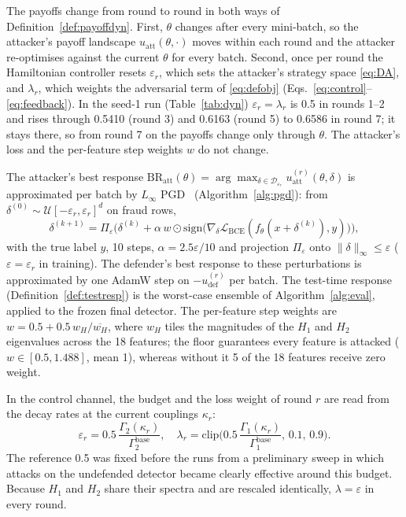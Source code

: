 \documentclass[conference]{IEEEtran}
\newcommand{\cL}{\mathcal{L}}
\newcommand{\BR}{\mathrm{BR}}
\newcommand{\sig}{\mathrm{sign}}
\begin{document}
The payoffs change from round to round in both ways of Definition~\ref{def:payoffdyn}. First, $\theta$ changes after every mini-batch, so the attacker's payoff landscape $u_{\mathrm{att}}(\theta,\cdot)$ moves within each round and the attacker re-optimises against the current $\theta$ for every batch. Second, once per round the Hamiltonian controller resets $\varepsilon_r$, which sets the attacker's strategy space \eqref{eq:DA}, and $\lambda_r$, which weights the adversarial term of \eqref{eq:defobj} (Eqs.~\eqref{eq:control}--\eqref{eq:feedback}). In the seed-1 run (Table~\ref{tab:dyn}) $\varepsilon_r=\lambda_r$ is 0.5 in rounds 1--2 and rises through 0.5410 (round 3) and 0.6163 (round 5) to 0.6586 in round 7; it stays there, so from round 7 on the payoffs change only through $\theta$. The attacker's loss and the per-feature step weights $w$ do not change.

The attacker's best response $\BR_{\mathrm{att}}(\theta)=\arg\max_{\delta\in\mathcal D_{\varepsilon_r}}u^{(r)}_{\mathrm{att}}(\theta,\delta)$ is approximated per batch by $L_\infty$ PGD~\cite{madry2018} (Algorithm~\ref{alg:pgd}): from $\delta^{(0)}\sim\mathcal U[-\varepsilon_r,\varepsilon_r]^d$ on fraud rows,
\begin{equation}
\delta^{(k+1)}=\Pi_\varepsilon\Big(\delta^{(k)}+\alpha\,w\odot\sig\big(\nabla_\delta\cL_{\mathrm{BCE}}(f_\theta(x+\delta^{(k)}),y)\big)\Big),
\label{eq:pgd}
\end{equation}
with the true label $y$, 10 steps, $\alpha=2.5\varepsilon/10$ and projection $\Pi_\varepsilon$ onto $\|\delta\|_\infty\le\varepsilon$ ($\varepsilon=\varepsilon_r$ in training). The defender's best response to these perturbations is approximated by one AdamW step on $-u^{(r)}_{\mathrm{def}}$ per batch. The test-time response (Definition~\ref{def:testresp}) is the worst-case ensemble of Algorithm~\ref{alg:eval}, applied to the frozen final detector. The per-feature step weights are $w=0.5+0.5\,w_H/\overline{w_H}$, where $w_H$ tiles the magnitudes of the $H_1$ and $H_2$ eigenvalues across the 18 features; the floor guarantees every feature is attacked ($w\in[0.5,1.488]$, mean 1), whereas without it 5 of the 18 features receive zero weight.

In the control channel, the budget and the loss weight of round $r$ are read from the decay rates at the current couplings $\kappa_r$:
\begin{equation}
\varepsilon_r=0.5\,\frac{\Gamma_2(\kappa_r)}{\Gamma_2^{\mathrm{base}}},\quad \lambda_r=\mathrm{clip}\Big(0.5\,\frac{\Gamma_1(\kappa_r)}{\Gamma_1^{\mathrm{base}}},\,0.1,\,0.9\Big).
\label{eq:control}
\end{equation}
The reference 0.5 was fixed before the runs from a preliminary sweep in which attacks on the undefended detector became clearly effective around this budget. Because $H_1$ and $H_2$ share their spectra and are rescaled identically, $\lambda=\varepsilon$ in every round.
\end{document}
